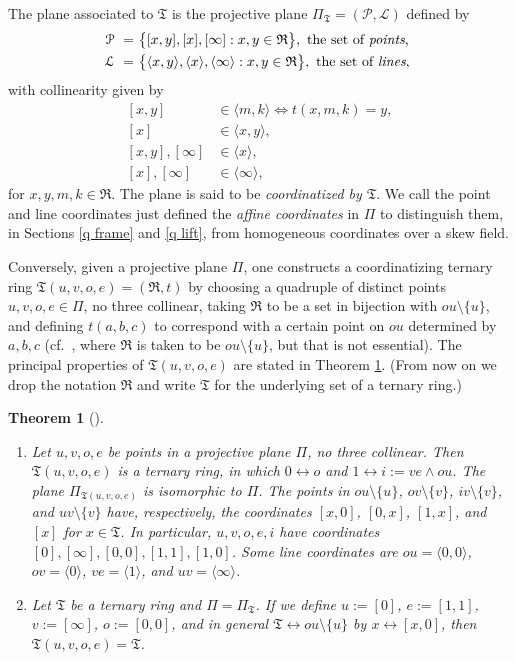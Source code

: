 \documentclass[reqno,12pt]{amsart}
\newtheorem{thm}{Theorem}[section]
\theoremstyle{remark}
\numberwithin{equation}{section}
\numberwithin{figure}{section}
\newcommand \lra{\leftrightarrow}
\renewcommand \cL{\mathcal{L}}	%
\newcommand \cP{\mathcal{P}}
\newcommand \fR{\mathfrak R}
\newcommand \fT{\mathfrak T}
\newcommand \hz{[\infty]}
\newcommand \hZ{\langle\infty\rangle}
\newcommand\PP{\Pi}	%
\begin{document}
The plane associated to $\fT$ is the projective plane $\PP_\fT=(\cP,\cL)$ defined by   
%
\begin{align*}
\cP \ = \ & \big\{ [x, y], [x], \hz: x,y \in \fR \big\}, \text{ the set of \emph{points},} \\ 
\cL \ = \ & \big\{ \langle x ,y  \rangle,  \langle x  \rangle,  \hZ: x,y \in \fR \big \},  \text{ the set of \emph{lines}, }
\end{align*}
%
with collinearity given by
%
\begin{equation}
\begin{aligned}{}
[x, y] &\in \langle m,k  \rangle \iff t(x,m,k) = y , \\ 
[x] &\in \langle x,y  \rangle , \\ 
[x,y], \hz &\in \langle x \rangle , \\ 
[x], \hz &\in \hZ , 
\end{aligned}
\label{E:coordinates}
\end{equation}
%
for $x,y,m,k \in \fR$.  The plane is said to be \emph{coordinatized by $\fT$}.  We call the point and line coordinates just defined the \emph{affine coordinates} in $\PP$ to distinguish them, in Sections \ref{q frame} and \ref{q lift}, from homogeneous coordinates over a skew field.

Conversely, given a projective plane $\PP$, one constructs a coordinatizing ternary ring $\fT(u,v,o,e) = (\fR,t)$ by choosing a quadruple of distinct points $u,v,o,e\in\PP$, no three collinear, taking $\fR$ to be a set in bijection with $ou \setminus \{u\}$, and defining $t(a,b,c)$ to correspond with a certain point on $ou$ determined by $a,b,c$ (cf.\ \cite[Construction 9.2.4]{st}, where $\fR$ is taken to be $ou \setminus \{u\}$, but that is not essential).  The principal properties of $\fT(u,v,o,e)$ are stated in Theorem \ref{pst}.  
(From now on we drop the notation $\fR$ and write $\fT$ for the underlying set of a ternary ring.)

\begin{thm}[{\cite[Section 9.2]{st}}] \label{pst} 
%
\begin{enumerate} [{\rm(a)}]
\item Let $u,v,o,e$ be points in a projective plane $\PP$, no three collinear. Then $\fT(u,v,o,e)$ is a ternary ring, in which $0 \lra o$ and $1 \lra i:= ve \wedge ou$.  The plane $\PP_{\fT(u,v,o,e)}$ is isomorphic to $\PP$.   The points in $ou\setminus \{u\}$, $ov\setminus \{v\}$, $iv\setminus \{ v \} $, and $uv\setminus \{v\}$ have, respectively, the coordinates $[x,0]$, $[0,x]$, $[1,x]$, and $[x]$ for $x \in \fT$.  In particular, $u,v,o,e,i$ have coordinates $[0], \hz, [0,0], [1,1], [1,0]$.  Some line coordinates are $ou = \langle0,0\rangle$, $ov = \langle0\rangle$, $ve = \langle1\rangle$, and $uv = \hZ$.
\label{pst:ptp}
\item Let $\fT$ be a ternary ring and $\PP = \PP_\fT$.  
If we define $u:=[0]$, $e:=[1,1]$, $v:=\hz$, $o:=[0,0]$, and in general $\fT\lra ou\setminus\{u\}$ by $x \lra [x,0]$, then $\fT(u,v,o,e) = \fT$.
\label{pst:tpt}
\end{enumerate}
%
\end{thm}
\end{document}
